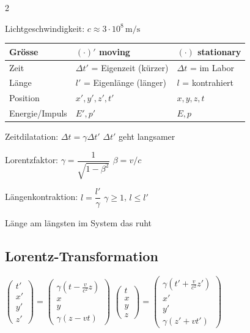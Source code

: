 \documentclass[10pt,a4paper]{article}
\newcommand{\yhbox}[1]{%
  \par\vspace{2pt}\noindent%
  \colorbox{yellow!35}{\parbox{\dimexpr\linewidth-2\fboxsep\relax}{\small#1}}%
  \par\vspace{2pt}}
\newcommand{\chbox}[1]{%
  \par\vspace{2pt}\noindent%
  \colorbox{magenta!25}{\parbox{\dimexpr\linewidth-2\fboxsep\relax}{#1}}%
  \par\vspace{2pt}}
\begin{document}
\begin{multicols}{2}
\chbox{Lichtgeschwindigkeit: $c\approx3\cdot10^8\,\text{m/s}$}

\par
{\footnotesize\renewcommand{\arraystretch}{1.1}
\begin{tabularx}{\linewidth}{|l|X|X|}
\hline
\textbf{Grösse} & \textbf{$(\cdot)'$ moving} & \textbf{$(\cdot)$ stationary} \\
\hline
Zeit & $\Delta t'$ = Eigenzeit (kürzer) & $\Delta t$ = im Labor \\
Länge & $l'$ = Eigenlänge (länger) & $l$ = kontrahiert \\
Position & $x',y',z',t'$ & $x,y,z,t$ \\
Energie/Impuls & $E',p'$ & $E,p$ \\
\hline
\end{tabularx}}

Zeitdilatation: $\boxed{\Delta t=\gamma\Delta t'}$ \quad $\Delta t'$ geht langsamer

Lorentzfaktor: $\boxed{\gamma=\dfrac{1}{\sqrt{1-\beta^2}}}$ \quad $\beta=v/c$

Längenkontraktion: $\boxed{l=\dfrac{l'}{\gamma}}$ \quad $\gamma\geq1$, $l\leq l'$

\yhbox{Länge am längsten im System das ruht}

\subsection{Lorentz-Transformation}

$\begin{pmatrix}t'\\x'\\y'\\z'\end{pmatrix}=\begin{pmatrix}\gamma(t-\frac{v}{c^2}z)\\x\\y\\\gamma(z-vt)\end{pmatrix}$ \quad
$\begin{pmatrix}t\\x\\y\\z\end{pmatrix}=\begin{pmatrix}\gamma(t'+\frac{v}{c^2}z')\\x'\\y'\\\gamma(z'+vt')\end{pmatrix}$


\end{multicols}
\end{document}
